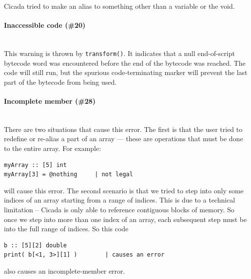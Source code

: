 \documentclass{article}
\newenvironment{code}{
       \begin{list}{}{
               \setlength{\leftmargin}{.4in}
               \setlength{\rightmargin}{0in}
               \setlength{\topsep}{.2in}
       }
       \small
       \item[] }
       { \end{list}   }
\begin{document}
Cicada tried to make an alias to something other than a variable or the void.\\




\paragraph{Inaccessible code (\#20)\\\\}

This warning is thrown by \verb#transform()#.  It indicates that a null end-of-script bytecode word was encountered before the end of the bytecode was reached.  The code will still run, but the spurious code-terminating marker will prevent the last part of the bytecode from being used.\\




\paragraph{Incomplete member (\#28)\\\\}

There are two situations that cause this error.  The first is that the user tried to redefine or re-alias a part of an array --- these are operations that must be done to the entire array.  For example:

\begin{code} \begin{verbatim}
myArray :: [5] int
myArray[3] = @nothing     | not legal
\end{verbatim} \end{code}

\noindent will cause this error.  The second scenario is that we tried to step into only some indices of an array starting from a range of indices.  This is due to a technical limitation -- Cicada is only able to reference contiguous blocks of memory.  So once we step into more than one index of an array, each subsequent step must be into the full range of indices.  So this code

\begin{code} \begin{verbatim}
b :: [5][2] double
print( b[<1, 3>][1] )        | causes an error
\end{verbatim} \end{code}

\noindent also causes an incomplete-member error.\\
\end{document}

